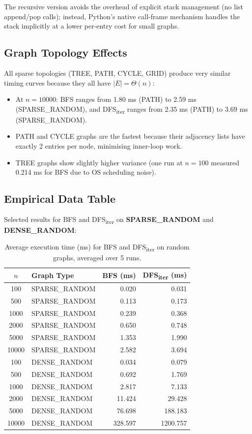The recursive version avoids the overhead of explicit stack management (no list append/pop calls); instead, Python's native call-frame mechanism handles the stack implicitly at a lower per-entry cost for small graphs.

\subsection{Graph Topology Effects}

All sparse topologies (TREE, PATH, CYCLE, GRID) produce very similar timing curves because they all have $|E| = \Theta(n)$:
\begin{itemize}
    \item At $n = 10000$: BFS ranges from 1.80 ms (PATH) to 2.59 ms (SPARSE\_RANDOM), and DFS\textsubscript{iter} ranges from 2.35 ms (PATH) to 3.69 ms (SPARSE\_RANDOM).
    \item PATH and CYCLE graphs are the fastest because their adjacency lists have exactly 2 entries per node, minimising inner-loop work.
    \item TREE graphs show slightly higher variance (one run at $n = 100$ measured 0.214 ms for BFS due to OS scheduling noise).
\end{itemize}

\subsection{Empirical Data Table}

Selected results for BFS and DFS\textsubscript{iter} on \textbf{SPARSE\_RANDOM} and \textbf{DENSE\_RANDOM}:

\begin{table}[h]
\centering
\caption{Average execution time (ms) for BFS and DFS\textsubscript{iter} on random graphs, averaged over 5 runs.}
\label{tab:results}
\begin{tabular}{|c|l|r|r|}
\hline
\textbf{$n$} & \textbf{Graph Type} & \textbf{BFS (ms)} & \textbf{DFS\textsubscript{iter} (ms)} \\
\hline
100   & SPARSE\_RANDOM & 0.020  & 0.031  \\
500   & SPARSE\_RANDOM & 0.113  & 0.173  \\
1000  & SPARSE\_RANDOM & 0.239  & 0.368  \\
2000  & SPARSE\_RANDOM & 0.650  & 0.748  \\
5000  & SPARSE\_RANDOM & 1.353  & 1.990  \\
10000 & SPARSE\_RANDOM & 2.582  & 3.694  \\
\hline
100   & DENSE\_RANDOM  & 0.034  & 0.079  \\
500   & DENSE\_RANDOM  & 0.692  & 1.769  \\
1000  & DENSE\_RANDOM  & 2.817  & 7.133  \\
2000  & DENSE\_RANDOM  & 11.424 & 29.428 \\
5000  & DENSE\_RANDOM  & 76.698 & 188.183 \\
10000 & DENSE\_RANDOM  & 328.597 & 1200.757 \\
\hline
\end{tabular}
\end{table}



